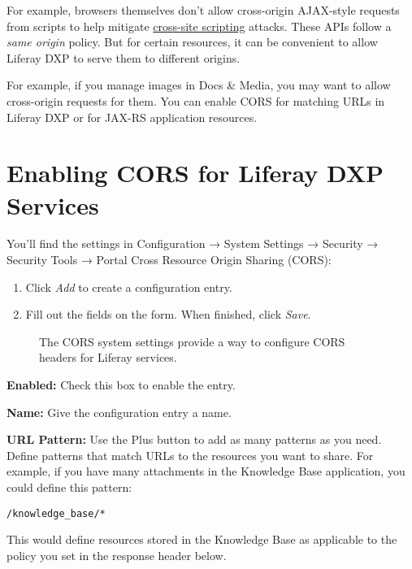 For example, browsers themselves don't allow cross-origin AJAX-style
requests from scripts to help mitigate
\href{https://en.wikipedia.org/wiki/Cross-site_scripting}{cross-site
scripting} attacks. These APIs follow a \emph{same origin} policy. But
for certain resources, it can be convenient to allow Liferay DXP to
serve them to different origins.

For example, if you manage images in Docs \& Media, you may want to
allow cross-origin requests for them. You can enable CORS for matching
URLs in Liferay DXP or for JAX-RS application resources.

\section{Enabling CORS for Liferay DXP
Services}\label{enabling-cors-for-liferay-dxp-services}

You'll find the settings in Configuration → System Settings → Security →
Security Tools → Portal Cross Resource Origin Sharing (CORS):

\begin{enumerate}
\def\labelenumi{\arabic{enumi}.}
\item
  Click \emph{Add} to create a configuration entry.
\item
  Fill out the fields on the form. When finished, click \emph{Save}.
\end{enumerate}

\begin{figure}
\centering
{}
\caption{The CORS system settings provide a way to configure CORS
headers for Liferay services.}
\end{figure}

\textbf{Enabled:} Check this box to enable the entry.

\textbf{Name:} Give the configuration entry a name.

\textbf{URL Pattern:} Use the Plus button to add as many patterns as you
need. Define patterns that match URLs to the resources you want to
share. For example, if you have many attachments in the Knowledge Base
application, you could define this pattern:

\begin{verbatim}
/knowledge_base/*
\end{verbatim}

This would define resources stored in the Knowledge Base as applicable
to the policy you set in the response header below.


